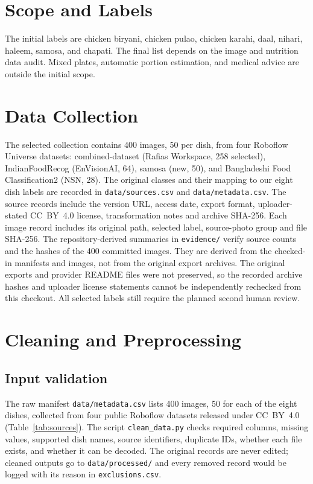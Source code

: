 \documentclass[11pt,a4paper]{article}
\begin{document}
\section{Scope and Labels}
The initial labels are chicken biryani, chicken pulao, chicken karahi, daal, nihari, haleem, samosa, and chapati. The final list depends on the image and nutrition data audit. Mixed plates, automatic portion estimation, and medical advice are outside the initial scope.

\section{Data Collection}
The selected collection contains 400 images, 50 per dish, from four Roboflow Universe datasets: combined-dataset (Rafias Workspace, 258 selected), IndianFoodRecog (EnVisionAI, 64), samosa (new, 50), and Bangladeshi Food Classification2 (NSN, 28). The original classes and their mapping to our eight dish labels are recorded in \texttt{data/sources.csv} and \texttt{data/metadata.csv}. The source records include the version URL, access date, export format, uploader-stated CC~BY~4.0 license, transformation notes and archive SHA-256. Each image record includes its original path, selected label, source-photo group and file SHA-256. The repository-derived summaries in \texttt{evidence/} verify source counts and the hashes of the 400 committed images. They are derived from the checked-in manifests and images, not from the original export archives. The original exports and provider README files were not preserved, so the recorded archive hashes and uploader license statements cannot be independently rechecked from this checkout. All selected labels still require the planned second human review.

\section{Cleaning and Preprocessing}

\subsection{Input validation}
The raw manifest \texttt{data/metadata.csv} lists 400 images, 50 for each of the eight dishes, collected from four public Roboflow datasets released under CC~BY~4.0 (Table~\ref{tab:sources}). The script \texttt{clean\_data.py} checks required columns, missing values, supported dish names, source identifiers, duplicate IDs, whether each file exists, and whether it can be decoded. The original records are never edited; cleaned outputs go to \texttt{data/processed/} and every removed record would be logged with its reason in \texttt{exclusions.csv}.
\end{document}
